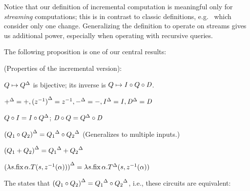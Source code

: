 Notice that our definition of incremental computation is meaningful only for \emph{streaming}
computations; this is in contrast to classic definitions, e.g.~\cite{gupta-idb95} which
consider only one change.  Generalizing the definition to operate on streams gives us
additional power, especially when operating with recursive queries.

The following proposition is one of our central results:

\begin{proposition}(Properties of the incremental version):
\label{prop-inc-properties}
\begin{description}[nosep, leftmargin=\parindent]
\item[inversion:] $Q\mapsto{Q}^{\Delta}$ is bijective; its inverse is $Q\mapsto \mathit{I}\circ Q\circ\mathit{D}$.
\item[invariance:] ${+}^{\Delta} = +, {(z^{-1})}^{\Delta} = z^{-1}, {-}^{\Delta} = -, {\mathit{I}}^{\Delta}=\mathit{I}, {\mathit{D}}^{\Delta}=\mathit{D}$
\item[push/pull:] \label{prop-part-commutation}
    $Q \circ \mathit{I} = \mathit{I} \circ {Q}^{\Delta}$; $\mathit{D}\circ Q = {Q}^{\Delta}\circ\mathit{D}$
\item[chain:] ${(Q_1\circ Q_2)}^{\Delta} = {Q_1}^{\Delta}\circ{Q_2}^{\Delta}$ (Generalizes to multiple inputs.)
\item[add:] ${(Q_1 + Q_2)}^{\Delta} = {Q_1}^{\Delta} + {Q_2}^{\Delta}$
\item[cycle:] ${(\lambda s. \mbox{fix}\,\alpha.T(s,z^{-1}(\alpha)))}^{\Delta} = \lambda s. \mbox{fix}\,\alpha.{T}^{\Delta}(s,z^{-1}(\alpha))$
\end{description}
\end{proposition}

The  states that ${(Q_1 \circ Q_2)}^{\Delta} =
{Q_1}^{\Delta} \circ {Q_2}^{\Delta}$, i.e., these circuits are equivalent:

